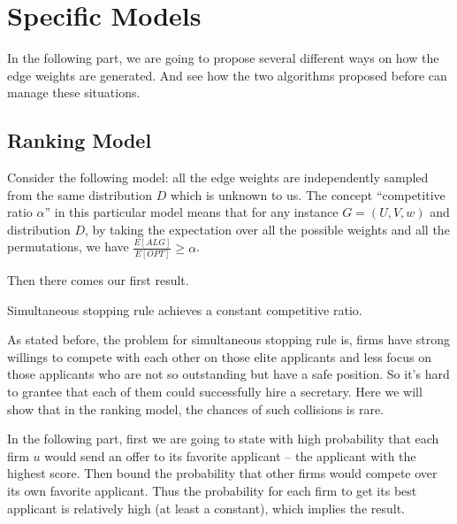 \chapter{Specific Models}

In the following part, we are going to propose several different ways 
on how the edge weights are generated. And see how the two algorithms
proposed before can manage these situations.

\section{Ranking Model}

Consider the following model:
all the edge weights are independently sampled from the same distribution $D$ which is unknown to us.
The concept ``competitive ratio $\alpha$'' in this particular model 
means that for any instance $G = (U, V, w)$ and distribution $D$, 
by taking the expectation over all the possible weights and 
all the permutations, we have $\frac{E[ALG]}{E[OPT]} \ge \alpha$.

Then there comes our first result.

\begin{theorem}\label{rothm}
    Simultaneous stopping rule achieves a constant competitive ratio.
\end{theorem}

As stated before, the problem for simultaneous stopping rule is, firms
have strong willings to compete with each other on those elite applicants
and less focus on those applicants who are not so outstanding but have
a safe position. So it's hard to grantee that each of them could
successfully hire a secretary. Here we will show that in the ranking model,
the chances of such collisions is rare.

In the following part, first we are going to state with high probability
that each firm $u$ would send an offer to its favorite applicant 
-- the applicant with the highest score.
Then bound the probability that other firms would compete over its own
favorite applicant. Thus the probability for each firm to get its
best applicant is relatively high (at least a constant), which implies
the result.


